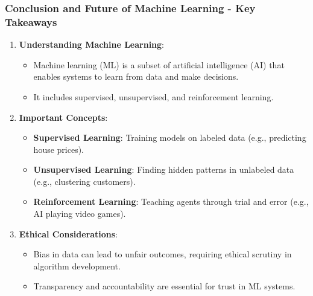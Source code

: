 \documentclass[aspectratio=169]{beamer}
\begin{document}
\begin{frame}[fragile]
  \frametitle{Conclusion and Future of Machine Learning - Key Takeaways}
  \begin{enumerate}
    \item \textbf{Understanding Machine Learning}:
    \begin{itemize}
      \item Machine learning (ML) is a subset of artificial intelligence (AI) that enables systems to learn from data and make decisions.
      \item It includes supervised, unsupervised, and reinforcement learning.
    \end{itemize}
    
    \item \textbf{Important Concepts}:
    \begin{itemize}
      \item \textbf{Supervised Learning}: Training models on labeled data (e.g., predicting house prices).
      \item \textbf{Unsupervised Learning}: Finding hidden patterns in unlabeled data (e.g., clustering customers).
      \item \textbf{Reinforcement Learning}: Teaching agents through trial and error (e.g., AI playing video games).
    \end{itemize}
    
    \item \textbf{Ethical Considerations}:
    \begin{itemize}
      \item Bias in data can lead to unfair outcomes, requiring ethical scrutiny in algorithm development.
      \item Transparency and accountability are essential for trust in ML systems.
    \end{itemize}
  \end{enumerate}
\end{frame}
\end{document}
